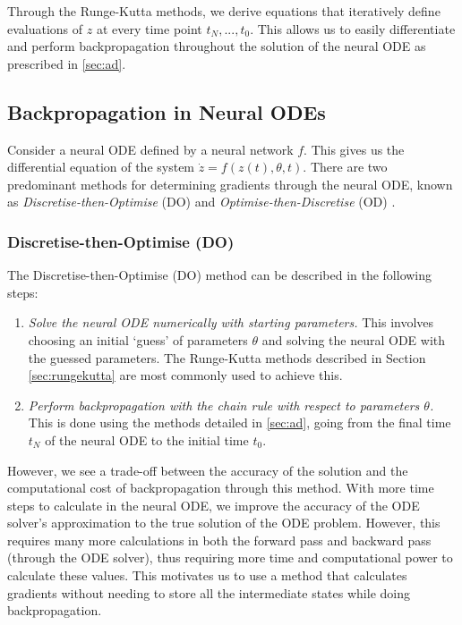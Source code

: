 \documentclass[a4paper,11pt,titlepage]{article}
\theoremstyle{definition}
\theoremstyle{plain}
\theoremstyle{remark}
\begin{document}
Through the Runge-Kutta methods, we derive equations that iteratively define evaluations of $z$ at every time point $t_N, ..., t_0$. This allows us to easily differentiate and perform backpropagation throughout the solution of the neural ODE as prescribed in \ref{sec:ad}.

\subsection{Backpropagation in Neural ODEs}

Consider a neural ODE defined by a neural network $f$. This gives us the differential equation of the system $\dot{z}=f(z(t),\theta,t)$. There are two predominant methods for determining gradients through the neural ODE, known as \textit{Discretise-then-Optimise} (DO) and \textit{Optimise-then-Discretise} (OD) \cite{kidger2022neural}.

\subsubsection{Discretise-then-Optimise (DO)}
\label{sec:do}

The Discretise-then-Optimise (DO) method can be described in the following steps:
\begin{enumerate}
    \item \textit{Solve the neural ODE numerically with starting parameters.} This involves choosing an initial ‘guess’ of parameters $\theta$ and solving the neural ODE with the guessed parameters. The Runge-Kutta methods described in Section \ref{sec:rungekutta} are most commonly used to achieve this.
    \item \textit{Perform backpropagation with the chain rule with respect to parameters $\theta$.} This is done using the methods detailed in \ref{sec:ad}, going from the final time $t_N$ of the neural ODE to the initial time $t_0$.
\end{enumerate}

However, we see a trade-off between the accuracy of the solution and the computational cost of backpropagation through this method. With more time steps to calculate in the neural ODE, we improve the accuracy of the ODE solver's approximation to the true solution of the ODE problem. However, this requires many more calculations in both the forward pass and backward pass (through the ODE solver), thus requiring more time and computational power to calculate these values. This motivates us to use a method that calculates gradients without needing to store all the intermediate states while doing backpropagation.
\end{document}
